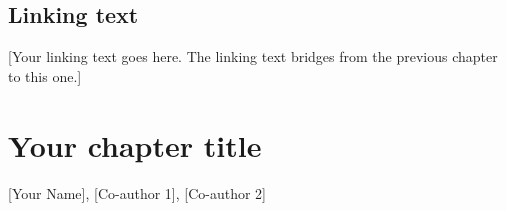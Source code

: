 %
%
%
%
%

\cleardoublepage
{}

\section*{Linking text}

[Your linking text goes here. The linking text bridges from the previous
chapter to this one.]

\clearpage

\chapter{Your chapter title}
\label{ch:chapter-template}

\begin{center}
\large [Your Name], [Co-author 1], [Co-author 2]
\end{center}

\vspace{1em}

